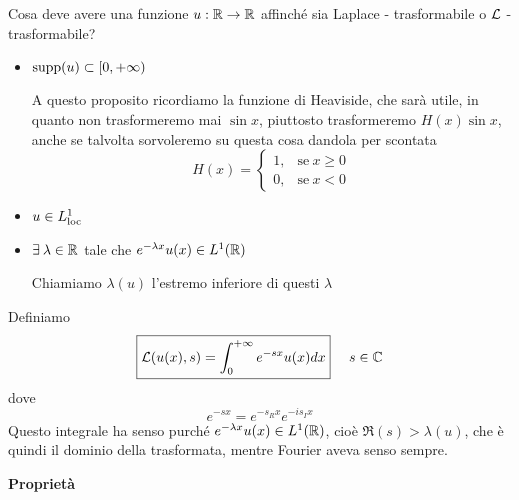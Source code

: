 Cosa deve avere una funzione $u: \mathbb{R}\rightarrow \mathbb{R}$ affinché sia Laplace - trasformabile o $\mathcal{L}$ - trasformabile?
\begin{itemize}
\item $\operatorname*{supp}(u) \subset [0, + \infty)$

A questo proposito ricordiamo la funzione di Heaviside, che sarà utile, in quanto non trasformeremo mai $\sin x$, piuttosto trasformeremo $H(x)\sin x$, anche se talvolta sorvoleremo su questa cosa dandola per scontata
\begin{equation*}
H(x) =
\begin{cases}
1, & \text{se} \ x \geq 0\\
0, & \text{se} \ x < 0
\end{cases}
\end{equation*}
\item $u\in L^{1}_{\operatorname{loc}}$
\item $\exists \lambda \in \RR$ tale che $e^{- \lambda x} u(x) \in L^{1}(\mathbb{R})$

Chiamiamo $\lambda (u)$ l'estremo inferiore di questi $\lambda $
\end{itemize}
\begin{defn}
Definiamo
\begin{equation*}
\boxed{\mathcal{L}(u(x), s) = \int^{+ \infty}_{0} e^{- sx} u(x) dx} \ \ \ \ s\in \mathbb{C}
\end{equation*}
dove
\begin{equation*}
e^{- sx} = e^{- s_{R} x} e^{- is_{I} x}
\end{equation*}
Questo integrale ha senso purché $e^{- \lambda x} u(x) \in L^{1}(\mathbb{R})$, cioè $\Re (s) > \lambda (u)$, che è quindi il dominio della trasformata, mentre Fourier aveva senso sempre.
\end{defn}
\textbf{Proprietà}
